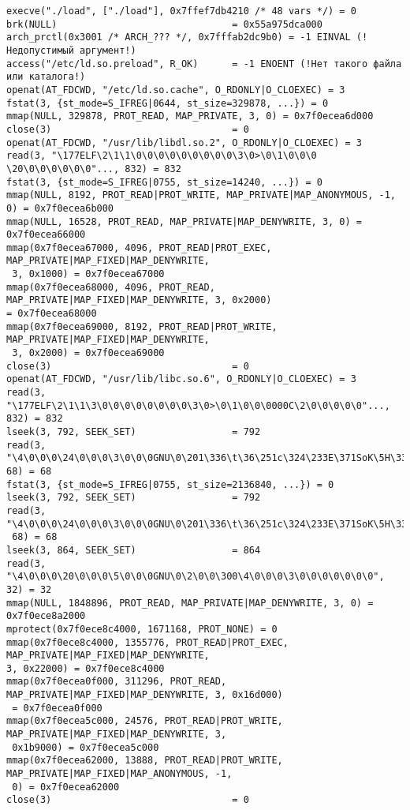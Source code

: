 \documentclass[12pt]{article}
\begin{document}
{{\begin{lstlisting}[escapechar=!]
execve("./load", ["./load"], 0x7ffef7db4210 /* 48 vars */) = 0
brk(NULL)                               = 0x55a975dca000
arch_prctl(0x3001 /* ARCH_??? */, 0x7fffab2dc9b0) = -1 EINVAL (!Недопустимый аргумент!)
access("/etc/ld.so.preload", R_OK)      = -1 ENOENT (!Нет такого файла или каталога!)
openat(AT_FDCWD, "/etc/ld.so.cache", O_RDONLY|O_CLOEXEC) = 3
fstat(3, {st_mode=S_IFREG|0644, st_size=329878, ...}) = 0
mmap(NULL, 329878, PROT_READ, MAP_PRIVATE, 3, 0) = 0x7f0ecea6d000
close(3)                                = 0
openat(AT_FDCWD, "/usr/lib/libdl.so.2", O_RDONLY|O_CLOEXEC) = 3
read(3, "\177ELF\2\1\1\0\0\0\0\0\0\0\0\0\3\0>\0\1\0\0\0 \20\0\0\0\0\0\0"..., 832) = 832
fstat(3, {st_mode=S_IFREG|0755, st_size=14240, ...}) = 0
mmap(NULL, 8192, PROT_READ|PROT_WRITE, MAP_PRIVATE|MAP_ANONYMOUS, -1, 0) = 0x7f0ecea6b000
mmap(NULL, 16528, PROT_READ, MAP_PRIVATE|MAP_DENYWRITE, 3, 0) = 0x7f0ecea66000
mmap(0x7f0ecea67000, 4096, PROT_READ|PROT_EXEC, MAP_PRIVATE|MAP_FIXED|MAP_DENYWRITE,
 3, 0x1000) = 0x7f0ecea67000
mmap(0x7f0ecea68000, 4096, PROT_READ, MAP_PRIVATE|MAP_FIXED|MAP_DENYWRITE, 3, 0x2000) 
= 0x7f0ecea68000
mmap(0x7f0ecea69000, 8192, PROT_READ|PROT_WRITE, MAP_PRIVATE|MAP_FIXED|MAP_DENYWRITE,
 3, 0x2000) = 0x7f0ecea69000
close(3)                                = 0
openat(AT_FDCWD, "/usr/lib/libc.so.6", O_RDONLY|O_CLOEXEC) = 3
read(3, "\177ELF\2\1\1\3\0\0\0\0\0\0\0\0\3\0>\0\1\0\0\0000C\2\0\0\0\0\0"..., 832) = 832
lseek(3, 792, SEEK_SET)                 = 792
read(3, "\4\0\0\0\24\0\0\0\3\0\0\0GNU\0\201\336\t\36\251c\324\233E\371SoK\5H\334"..., 
68) = 68
fstat(3, {st_mode=S_IFREG|0755, st_size=2136840, ...}) = 0
lseek(3, 792, SEEK_SET)                 = 792
read(3, "\4\0\0\0\24\0\0\0\3\0\0\0GNU\0\201\336\t\36\251c\324\233E\371SoK\5H\334"...,
 68) = 68
lseek(3, 864, SEEK_SET)                 = 864
read(3, "\4\0\0\0\20\0\0\0\5\0\0\0GNU\0\2\0\0\300\4\0\0\0\3\0\0\0\0\0\0\0", 32) = 32
mmap(NULL, 1848896, PROT_READ, MAP_PRIVATE|MAP_DENYWRITE, 3, 0) = 0x7f0ece8a2000
mprotect(0x7f0ece8c4000, 1671168, PROT_NONE) = 0
mmap(0x7f0ece8c4000, 1355776, PROT_READ|PROT_EXEC, MAP_PRIVATE|MAP_FIXED|MAP_DENYWRITE, 
3, 0x22000) = 0x7f0ece8c4000
mmap(0x7f0ecea0f000, 311296, PROT_READ, MAP_PRIVATE|MAP_FIXED|MAP_DENYWRITE, 3, 0x16d000)
 = 0x7f0ecea0f000
mmap(0x7f0ecea5c000, 24576, PROT_READ|PROT_WRITE, MAP_PRIVATE|MAP_FIXED|MAP_DENYWRITE, 3,
 0x1b9000) = 0x7f0ecea5c000
mmap(0x7f0ecea62000, 13888, PROT_READ|PROT_WRITE, MAP_PRIVATE|MAP_FIXED|MAP_ANONYMOUS, -1,
 0) = 0x7f0ecea62000
close(3)                                = 0

\end{lstlisting}}}
\end{document}
